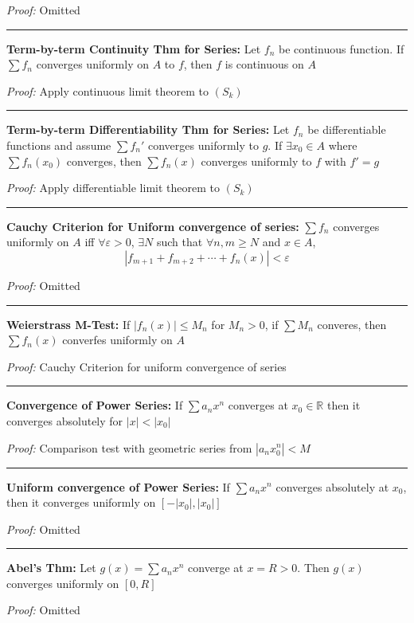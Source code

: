\documentclass[12pt]{article}
\newcommand{\R}{\mathbb{R}}
\newcommand{\abs}[1]{\left\vert #1 \right\vert}
\newcommand{\ep}{\varepsilon}
\renewcommand{\hline}{\vspace*{10pt} \hrule \vspace*{10pt}}
\begin{document}
        \emph{Proof:} Omitted

    \hline 

    \textbf{Term-by-term Continuity Thm for Series:} Let $f_n$ be continuous function. If $\sum f_n$ converges uniformly on $A$ to $f$, then $f$ is continuous on $A$

        \emph{Proof:} Apply continuous limit theorem to $(S_k)$

    \hline 

    \textbf{Term-by-term Differentiability Thm for Series:} Let $f_n$ be differentiable functions and assume $\sum f_n'$ converges uniformly to $g$. If $\exists x_0 \in A$ where $\sum f_n(x_0)$ converges, then $\sum f_n(x)$ converges uniformly to $f$ with $f' = g$

        \emph{Proof:} Apply differentiable limit theorem to $(S_k)$ 

    \hline 

    \textbf{Cauchy Criterion for Uniform convergence of series:} $\sum f_n$ converges uniformly on $A$ iff $\forall \ep > 0$, $\exists N$ such that $\forall n, m \geq N$ and $x \in A$,
    \[\abs{f_{m+1} + f_{m+2} + \cdots + f_n(x)} < \ep\]

        \emph{Proof:} Omitted

    \hline

    \textbf{Weierstrass M-Test:} If $\abs{f_n(x)} \leq M_n$ for $M_n > 0$, if $\sum M_n$ converes, then $\sum f_n(x)$ converfes uniformly on $A$

        \emph{Proof:} Cauchy Criterion for uniform convergence of series

    \hline

    \textbf{Convergence of Power Series:} If $\sum a_n x^n$ converges at $x_0 \in \R$ then it converges absolutely for $\abs{x} < \abs{x_0}$ 

        \emph{Proof:} Comparison test with geometric series from $\abs{a_n x_0^n} < M$ 

    \hline

    \textbf{Uniform convergence of Power Series:} If $\sum a_n x^n$ converges absolutely at $x_0$, then it converges uniformly on $[-\abs{x_0}, \abs{x_0}]$ 

        \emph{Proof:} Omitted

    \hline 

    \textbf{Abel's Thm:} Let $g(x) = \sum a_n x^n$ converge at $x = R > 0$. Then $g(x)$ converges uniformly on $[0, R]$

        \emph{Proof:} Omitted
\end{document}
